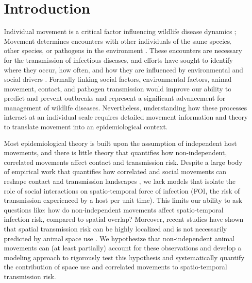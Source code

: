 ﻿\documentclass[11pt]{article}
\begin{document}
\newpage{}

\section*{Introduction}



Individual movement is a critical factor influencing wildlife disease dynamics \citep{Dougherty2018,Manlove2022};
Movement determines encounters with other individuals of the same species, other species, or pathogens in the environment \citep{Martinez-Garcia2020,Das2023}. 
These encounters are necessary for the transmission of infectious diseases, and efforts have sought to identify where they occur, how often, and how they are influenced by environmental and social drivers \citep{Titcomb2021,Dougherty2022,Webber2023}. 
Formally linking social factors, environmental factors, animal movement, contact, and pathogen transmission would improve our ability to predict and prevent outbreaks and represent a significant advancement for management of wildlife diseases.  
Nevertheless, understanding how these processes interact at an individual scale requires detailed movement information and theory to translate movement into an epidemiological context.

Most epidemiological theory is built upon the assumption of independent host movements, and there is little theory that quantifies how non-independent, correlated movements affect contact and transmission risk. Despite a large body of empirical work that quantifies how correlated and social movements can reshape contact and transmission landscapes \citep[e.g.,][]{Kjaer2008,Grear2010,Schauber2015a}, we lack models that isolate the role of social interactions on spatio-temporal force of infection (FOI, the risk of transmission experienced by a host per unit time). This limits our ability to ask questions like: how do non-independent movements affect spatio-temporal infection risk, compared to spatial overlap?  Moreover, recent studies have shown that spatial transmission risk can be highly localized \citep{Albery2021} and is not necessarily predicted by animal space use \citep{Yang2023a}. We hypothesize that non-independent animal movements can (at least partially) account for these observations and develop a modeling approach to rigorously test this hypothesis and systematically quantify the contribution of space use and correlated movements to spatio-temporal transmission risk.
\end{document}

